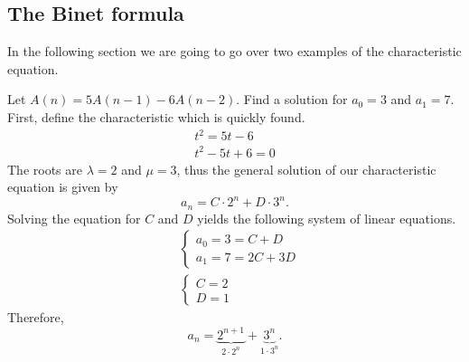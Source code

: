 \subsection{The Binet formula}
In the following section we are going to go over two examples of the characteristic equation. 
\begin{exmp}
Let $A(n)=5 A(n-1)-6A(n-2)$. Find a solution for $a_0=3$ and $a_1=7$. First, define the characteristic which is quickly found.
\begin{align*}
t^2=5t-6\\
t^2-5t+6=0
\end{align*}
The roots are $\lambda=2$ and $\mu=3$, thus the general solution of our characteristic equation is given by
$$
a_n=C \cdot 2^n + D \cdot 3^n.
$$
Solving the equation for $C$ and $D$ yields the following system of linear equations.
\begin{align*}
    &\begin{cases}
        a_0 = 3 = C + D\\    
        a_1 = 7 = 2C + 3D   
    \end{cases}\\
    &\begin{cases}
        C=2\\
        D=1
    \end{cases}
\end{align*}
Therefore, 
$$
a_n=\underbrace{2^{n+1}}_{2 \cdot 2^n} + \underbrace{3^n}_{1 \cdot 3^n}.
$$
\end{exmp}

